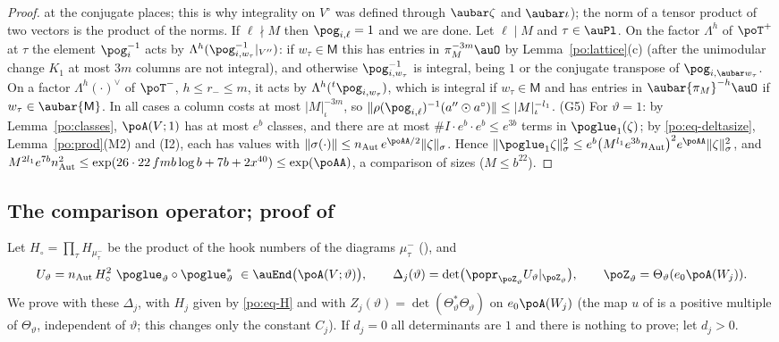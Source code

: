 \documentclass[10pt]{amsart}
\theoremstyle{definition}
\theoremstyle{remark}
\begin{document}
\begin{proof}
at the conjugate places; this is why integrality on $V^\circ$ was defined through $\aubar\zeta$
and $\aubar\iota$); the norm of a tensor product of two vectors is the product of the norms.
If $\ell\nmid M$ then $\pog_{i,\ell}=1$ and we are done. Let $\ell\mid M$ and $\tau\in\auPl$. On the
factor $\Lambda^h$ of $\poT^+$ at $\tau$ the element $\pog_i^{-1}$ acts by
$\Lambda^h(\pog_{i,w_\tau}^{-1}|_{V''})$: if $w_\tau\in\mathsf M$ this has entries in
$\pi_M^{-3m}\auO$ by Lemma~\ref{po:lattice}(c) (after the unimodular change $K_1$ at most $3m$
columns are not integral), and otherwise $\pog_{i,w_\tau}^{-1}$ is integral, being $1$ or the
conjugate transpose of $\pog_{i,\aubar w_\tau}$. On a factor $\Lambda^h(\cdot)^\vee$ of $\poT^-$,
$h\le r_-\le m$, it acts by $\Lambda^h({}^t\pog_{i,w_\tau})$, which is integral if
$w_\tau\in\mathsf M$ and has entries in $\aubar{\pi_M}^{-h}\auO$ if $w_\tau\in\aubar{\mathsf M}$.
In all cases a column costs at most $|M|_\iota^{-3m}$, so $\|\rho(\pog_{i,\ell})^{-1}(a''\odot
a^\circ)\|\le|M|_\iota^{-l_1}$.
(G5) For $\vartheta=1$: by Lemma~\ref{po:classes}, $\poA(V;1)$ has at most $e^b$ classes, and
there are at most $\#I\cdot e^b\cdot e^b\le e^{3b}$ terms in $\poglue_1(\zeta)$; by
\eqref{po:eq-deltasize}, Lemma~\ref{po:prod}(M2) and (I2), each has values with
$\|\sigma(\cdot)\|\le n_{\mathrm{Aut}}\,e^{\poAA/2}\|\zeta\|_\sigma$. Hence
$\|\poglue_1\zeta\|_\sigma^2\le e^b\bigl(M^{l_1}e^{3b}n_{\mathrm{Aut}}\bigr)^2e^{\poAA}\|\zeta\|_\sigma^2$,
and $M^{2l_1}e^{7b}n_{\mathrm{Aut}}^2\le\exp(26\cdot22\,fmb\log b+7b+2x^{40})\le\exp(\poAA)$, a
comparison of sizes ($M\le b^{22}$).
\end{proof}

\subsection{The comparison operator; proof of \texorpdfstring{{\cite[Proposition~14.41]{P46}}}{[Row D, Proposition~14.41]}}\label{po:ss-proof}

Let $H_\circ=\prod_\tau H_{\mu^-_\tau}$ be the product of the hook numbers of the diagrams
$\mu^-_\tau$ ({\cite[Lemma~5.22]{P49}}), and
\[
U_\vartheta=n_{\mathrm{Aut}}\,H_\circ^2\ \poglue_\vartheta\circ\poglue_\vartheta^*\ \in\auEnd\bigl(
\poA(V;\vartheta)\bigr),\qquad\Delta_j(\vartheta)=\det\bigl(\popr_{\poZ_\vartheta}U_\vartheta
|_{\poZ_\vartheta}\bigr),\qquad\poZ_\vartheta=\Theta_\vartheta(e_0\poA(W_j)).
\]
We prove {\cite[Proposition~14.41]{P46}} with these $\Delta_j$, with $H_j$ given by \eqref{po:eq-H}
and with $Z_j(\vartheta)=\det(\Theta_\vartheta^*\Theta_\vartheta)$ on $e_0\poA(W_j)$ (the map $u$
of {\cite[Proposition~14.37]{P46}} is a positive multiple of $\Theta_\vartheta$, independent of
$\vartheta$; this changes only the constant $C_j$). If $d_j=0$ all determinants are $1$ and there
is nothing to prove; let $d_j>0$.
\end{document}
